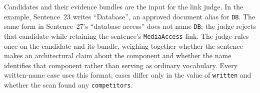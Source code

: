 Candidates and their evidence bundles are the input for the link judge.
In the example, Sentence~23 writes ``Database'', an approved document alias for \texttt{DB}.
The same form in Sentence~27's ``database access'' does not name \texttt{DB}; the judge rejects that candidate while retaining the sentence's \texttt{MediaAccess} link.
The judge rules once on the candidate and its bundle, weighing together whether the sentence makes an architectural claim about the component and whether the name identifies that component rather than serving as ordinary vocabulary.
Every written-name case uses this format; cases differ only in the value of \texttt{written} and whether the scan found any \texttt{competitors}.


